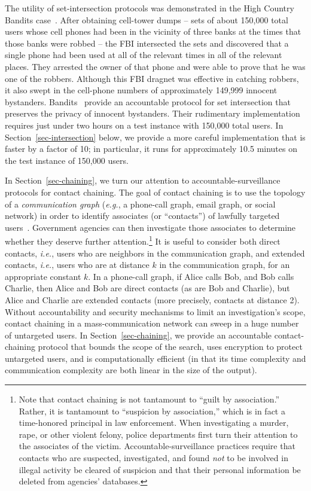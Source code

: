 The utility of set-intersection protocols was demonstrated in the 
High Country Bandits case~\cite{anderson13cell}.
After obtaining cell-tower dumps -- sets of about 150,000 total users
whose cell phones had been in the vicinity of three banks at the times
that those banks were robbed -- the FBI intersected the sets and discovered 
that a single phone had been used at all of the relevant times in all of the 
relevant places.  They arrested the owner
of that phone and were able to prove that he was one of the robbers.
Although this FBI dragnet was effective in catching robbers, it also swept
in the cell-phone numbers of approximately 149,999 innocent bystanders.
Bandits~\cite{sff-foci2014} provide an accountable protocol for
set intersection that preserves the privacy of innocent bystanders.  Their
rudimentary implementation requires just under two hours on a test instance
with 150,000 total users.  In Section~\ref{sec-intersection} below, we provide
a more careful implementation that is faster by a factor of 10; in particular,
it runs for approximately 10.5 minutes on the test instance of 150,000 users.

In Section~\ref{sec-chaining}, we turn our attention to 
accountable-surveillance protocols for contact chaining.
The goal of contact chaining is to use the topology of a {\it communication 
graph} ({\it e.g.}, a phone-call graph, email graph, or social network) 
in order to identify associates (or ``contacts'') of lawfully targeted users~\cite{techdirt}. 
Government agencies can then investigate those associates to determine whether
they deserve further attention.\footnote{Note that contact chaining is not
tantamount to ``guilt by association.''  Rather, it is tantamount to
``suspicion by association,'' which is in fact a time-honored principal in
law enforcement.  When investigating a murder, rape, or other violent felony,
police departments first turn their attention to the associates of the victim.
Accountable-surveillance practices require that contacts who are suspected,
investigated, and found {\it not} to be involved in illegal activity be 
cleared of suspicion and that their personal information be deleted from 
agencies' databases.} It is useful to consider both direct contacts, 
{\it i.e.}, users who are neighbors in the communication graph, and
extended contacts, {\it i.e.}, users who are at distance $k$ in the 
communication graph, for an appropriate constant $k$.
In a phone-call graph, if Alice calls Bob, 
and Bob calls Charlie, then Alice and Bob are direct contacts (as are Bob and 
Charlie), but Alice and Charlie are extended contacts (more precisely,
contacts at distance 2).  Without accountability and security mechanisms to
limit an investigation's scope, contact chaining in a mass-communication
network can sweep in a huge number of untargeted users.
In Section~\ref{sec-chaining}, we provide an accountable contact-chaining
protocol that bounds the scope of the search, uses encryption to protect 
untargeted users, and is computationally efficient (in that its time
complexity and communication complexity are both linear in the size of the 
output).

